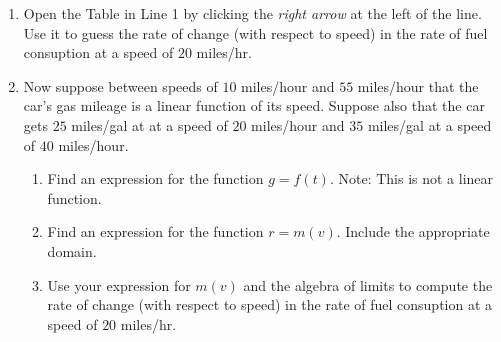 \documentclass{ximera}
\begin{document}
\begin{question}
\begin{enumerate}
\item Open the Table in Line 1 by clicking the \emph{right arrow} at the left of the line. Use it to guess the rate of change (with respect to speed) in the  rate of fuel consuption at a speed of $20$ miles/hr.

\item Now suppose between speeds of $10$ miles/hour and $55$ miles/hour that the car's gas mileage is a linear function of its speed. Suppose also that the car gets $25$ miles/gal at at a speed of $20$ miles/hour and $35$ miles/gal at a speed of $40$ miles/hour.

\begin{enumerate}
\item Find an expression for the function $g=f(t)$. Note: This is not a linear function.

\item Find an expression for the function $r=m(v)$. Include the appropriate domain.

\item Use your expression for $m(v)$ and the algebra of limits to compute the rate of change (with respect to speed) in the rate of fuel consuption at a speed of $20$ miles/hr.

\end{enumerate}

\end{enumerate}
\end{question}
\end{document}
